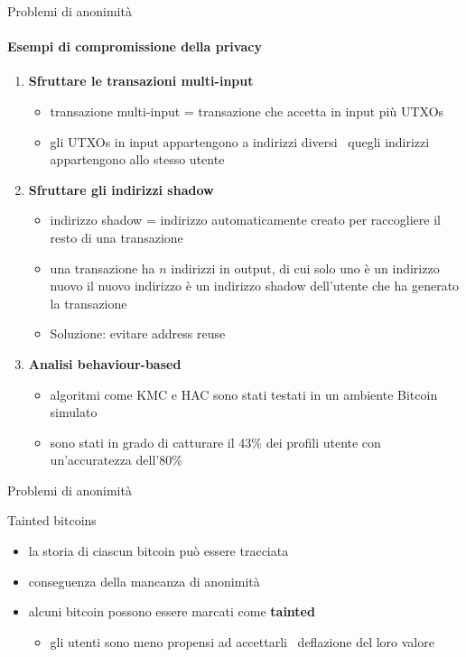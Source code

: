 \documentclass{beamer}
\begin{document}
  \begin{frame}{Problemi di anonimità}
  \framesubtitle{Esempi di compromissione della privacy}
      \begin{enumerate}
          \item \textbf{Sfruttare le transazioni multi-input}
          \begin{itemize}
              \item transazione multi-input = transazione che accetta in input più UTXOs 
              \item gli UTXOs in input appartengono a indirizzi diversi \MVRightarrow\, quegli indirizzi appartengono allo stesso utente
          \end{itemize}
          \pause
          \item \textbf{Sfruttare gli indirizzi shadow}
          \begin{itemize}
              \item indirizzo shadow = indirizzo automaticamente creato per raccogliere il resto di una transazione
              \item una transazione ha $n$ indirizzi in output, di cui solo uno è un indirizzo nuovo \MVRightarrow il nuovo indirizzo è un indirizzo shadow dell'utente che ha generato la transazione
              \item Soluzione: evitare address reuse 
          \end{itemize}
          \pause
          \item \textbf{Analisi behaviour-based}
          \begin{itemize}
              \item algoritmi come KMC e HAC sono stati testati in un ambiente Bitcoin simulato \cite{androulaki2013evaluating}
              \item sono stati in grado di catturare il 43\% dei profili utente con un'accuratezza dell'80\% 
          \end{itemize}
      \end{enumerate}
  \end{frame}
  
  
  
  \begin{frame}{Problemi di anonimità}
      \begin{block}{Tainted bitcoins}
        \begin{itemize}
            \item la storia di ciascun bitcoin può essere tracciata
            \item conseguenza della mancanza di anonimità
            \item alcuni bitcoin possono essere marcati come \textbf{tainted}
            \begin{itemize}
                \item gli utenti sono meno propensi ad accettarli \MVRightarrow\, deflazione del loro valore
            \end{itemize}
        \end{itemize}
      \end{block}
  \end{frame}
  
\end{document}
